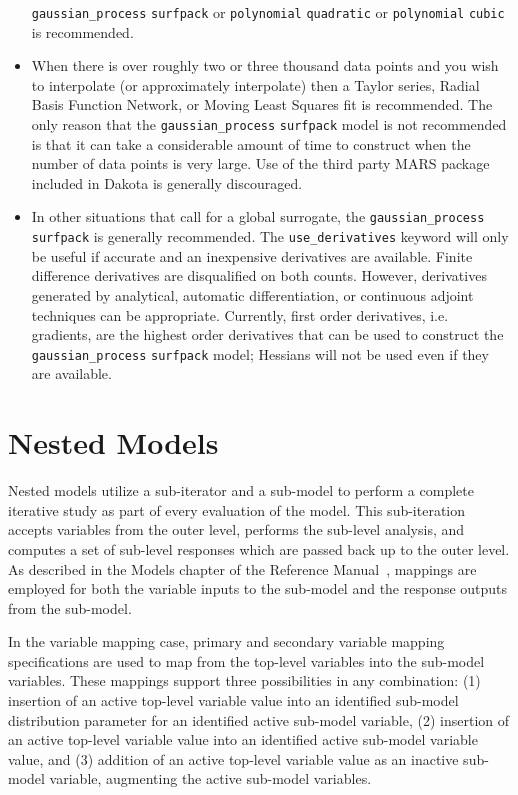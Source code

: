 \begin{itemize}
      \texttt{gaussian\_process} \texttt{surfpack} or 
      \texttt{polynomial} \texttt{quadratic} or 
      \texttt{polynomial} \texttt{cubic} is recommended.
\item When there is over roughly two or three thousand data points 
      and you wish to interpolate (or approximately interpolate) then 
      a Taylor series, Radial Basis Function Network, or Moving Least
      Squares fit is recommended.  The only reason that the 
      \texttt{gaussian\_process} \texttt{surfpack} model is not 
      recommended is that it can take a considerable amount of time
      to construct when the number of data points is very large.  Use 
      of the third party MARS package included in Dakota is generally 
      discouraged.
\item In other situations that call for a global surrogate, the 
      \texttt{gaussian\_process} \texttt{surfpack} is generally 
      recommended.  The \texttt{use\_derivatives} keyword will 
      only be useful if accurate and an inexpensive derivatives 
      are available. Finite difference derivatives are disqualified 
      on both counts.  However, derivatives generated by analytical,
      automatic differentiation, or continuous adjoint techniques
      can be appropriate.  Currently, first order derivatives, i.e.
      gradients, are the highest order derivatives that can be used
      to construct the \texttt{gaussian\_process} \texttt{surfpack}
      model; Hessians will not be used even if they are available.
\end{itemize}

\section{Nested Models} \label{models:nested}

Nested models utilize a sub-iterator and a sub-model to perform a
complete iterative study as part of every evaluation of the model.
This sub-iteration accepts variables from the outer level, performs
the sub-level analysis, and computes a set of sub-level responses
which are passed back up to the outer level.  As described in the
Models chapter of the Reference Manual~\cite{RefMan}, mappings are
employed for both the variable inputs to the sub-model and the
response outputs from the sub-model.

In the variable mapping case, primary and secondary variable
mapping specifications are used to map from the top-level variables
into the sub-model variables.  These mappings support three
possibilities in any combination: (1) insertion of an active top-level
variable value into an identified sub-model distribution parameter for
an identified active sub-model variable, (2) insertion of an active
top-level variable value into an identified active sub-model variable
value, and (3) addition of an active top-level variable value as an
inactive sub-model variable, augmenting the active sub-model
variables.

